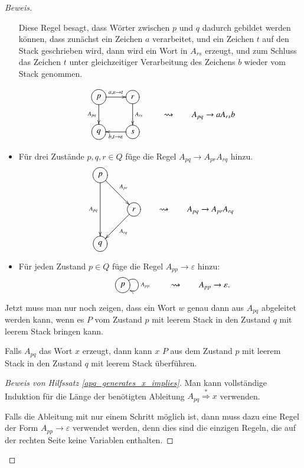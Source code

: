 \begin{proof}[Beweis]
\begin{itemize}
Diese Regel besagt, dass Wörter zwischen $p$ und $q$ dadurch gebildet
werden können, dass zunächst ein Zeichen $a$ verarbeitet, und
ein Zeichen $t$ auf den Stack geschrieben wird, dann wird ein Wort
in $A_{rs}$ erzeugt, und zum Schluss das Zeichen $t$ unter
gleichzeitiger Verarbeitung des Zeichens $b$ wieder vom Stack
genommen.

\[
\begin{gathered}
\entrymodifiers={++[o][F]}
\xymatrix{
{p}      \ar[r]^{a,\varepsilon\to t} \ar[d]_{A_{pq}}
	&{r}\ar[d]^{A_{rs}}
\\
{q}
	&{s}\ar[l]^{b,t\to\varepsilon}
}
\end{gathered}
\qquad\rightsquigarrow\qquad A_{pq}\to aA_{rs}b
\]


\item Für drei Zustände $p,q,r\in Q$ füge die Regel 
$A_{pq}\to A_{pr}A_{rq}$ hinzu.
\[
\begin{gathered}
\entrymodifiers={++[o][F]}
\xymatrix{
{p}\ar[dr]^{A_{pr}}\ar[dd]_{A_{pq}}
\\
*+\txt{}
	&{r}\ar[dl]^{A_{rq}}
\\
{q}
}
\end{gathered}
\qquad\rightsquigarrow\qquad A_{pq}\to A_{pr}A_{rq}
\]
\item Für jeden Zustand $p\in Q$ füge die Regel $A_{pp}\to \varepsilon$
hinzu:
\[
\begin{gathered}
\entrymodifiers={++[o][F]}
\xymatrix{
*+\txt{}
	&{p} \ar@(ur,dr)^{A_{pp}}
}
\end{gathered}
\qquad\rightsquigarrow\qquad
A_{pp}\to\varepsilon.
\]
\end{itemize}
Jetzt muss man nur noch zeigen, dass ein Wort $w$ genau dann aus $A_{pq}$
abgeleitet werden kann, wenn es $P$ vom Zustand $p$ mit leerem Stack
in den Zustand $q$ mit leerem Stack bringen kann.


\begin{hilfssatz}\label{apq_generates_x_implies}
Falls $A_{pq}$ das Wort $x$ erzeugt, dann kann $x$ $P$ aus dem Zustand
$p$ mit leerem Stack in den Zustand $q$ mit leerem Stack überführen.
\end{hilfssatz}

\begin{proof}[Beweis von Hilfssatz \ref{apq_generates_x_implies}]
Man kann vollständige Induktion für die Länge der be\-nötigten 
Ableitung $A_{pq}\overset{*}{\Rightarrow} x$ verwenden.

Falls die Ableitung mit nur einem Schritt möglich ist, dann muss
dazu eine Regel der Form $A_{pp}\to\varepsilon$ verwendet werden,
denn dies sind die einzigen Regeln, die auf der rechten Seite
keine Variablen enthalten. 


\end{proof}
\end{proof}
